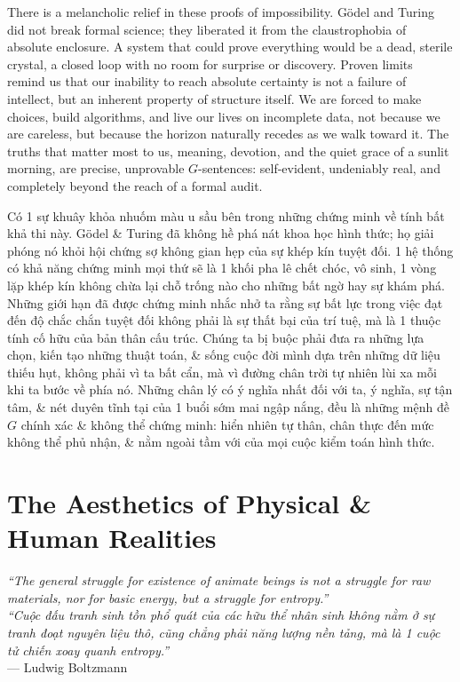 \documentclass[11pt]{article}
\begin{document}
There is a melancholic relief in these proofs of impossibility. G\"odel and Turing did not break formal science; they liberated it from the claustrophobia of absolute enclosure. A system that could prove everything would be a dead, sterile crystal, a closed loop with no room for surprise or discovery. Proven limits remind us that our inability to reach absolute certainty is not a failure of intellect, but an inherent property of structure itself. We are forced to make choices, build algorithms, and live our lives on incomplete data, not because we are careless, but because the horizon naturally recedes as we walk toward it. The truths that matter most to us, meaning, devotion, and the quiet grace of a sunlit morning, are precise, unprovable $G$-sentences: self-evident, undeniably real, and completely beyond the reach of a formal audit.

Có 1 sự khuây khỏa nhuốm màu u sầu bên trong những chứng minh về tính bất khả thi này. G\"odel \& Turing đã không hề phá nát khoa học hình thức; họ giải phóng nó khỏi hội chứng sợ không gian hẹp của sự khép kín tuyệt đối. 1 hệ thống có khả năng chứng minh mọi thứ sẽ là 1 khối pha lê chết chóc, vô sinh, 1 vòng lặp khép kín không chừa lại chỗ trống nào cho những bất ngờ hay sự khám phá. Những giới hạn đã được chứng minh nhắc nhở ta rằng sự bất lực trong việc đạt đến độ chắc chắn tuyệt đối không phải là sự thất bại của trí tuệ, mà là 1 thuộc tính cố hữu của bản thân cấu trúc. Chúng ta bị buộc phải đưa ra những lựa chọn, kiến tạo những thuật toán, \& sống cuộc đời mình dựa trên những dữ liệu thiếu hụt, không phải vì ta bất cẩn, mà vì đường chân trời tự nhiên lùi xa mỗi khi ta bước về phía nó. Những chân lý có ý nghĩa nhất đối với ta, ý nghĩa, sự tận tâm, \& nét duyên tĩnh tại của 1 buổi sớm mai ngập nắng, đều là những mệnh đề $G$ chính xác \& không thể chứng minh: hiển nhiên tự thân, chân thực đến mức không thể phủ nhận, \& nằm ngoài tầm với của mọi cuộc kiểm toán hình thức.

\part{The Aesthetics of Physical \& Human Realities}

\vspace{0.5cm}
\begin{flushright}
    \begin{minipage}{0.65\textwidth}
        \textit{``The general struggle for existence of animate beings is not a struggle for raw materials, nor for basic energy, but a struggle for entropy.''} \\
        \textit{``Cuộc đấu tranh sinh tồn phổ quát của các hữu thể nhân sinh không nằm ở sự tranh đoạt nguyên liệu thô, cũng chẳng phải năng lượng nền tảng, mà là 1 cuộc tử chiến xoay quanh entropy.''} \\
        \vspace{1mm}
        \raggedleft \textsf{--- Ludwig Boltzmann}
    \end{minipage}
\end{flushright}
\vspace{1cm}
\end{document}
